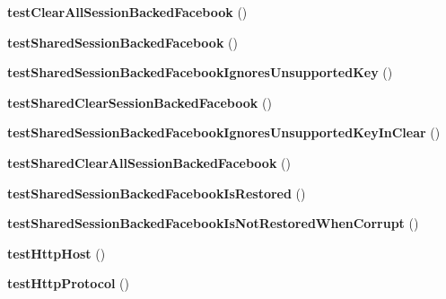 \begin{DoxyCompactItemize}
\item 
\hypertarget{classPHPSDKTestCase_aa4e705ef2f9d8cc54d60a7defe386fb5}{{\bfseries test\-Clear\-All\-Session\-Backed\-Facebook} ()}\label{classPHPSDKTestCase_aa4e705ef2f9d8cc54d60a7defe386fb5}

\item 
\hypertarget{classPHPSDKTestCase_aa0ad510cb5d7db6fb845dbf7a67532d5}{{\bfseries test\-Shared\-Session\-Backed\-Facebook} ()}\label{classPHPSDKTestCase_aa0ad510cb5d7db6fb845dbf7a67532d5}

\item 
\hypertarget{classPHPSDKTestCase_a2acdef47be22ffc68259da2e4dfaf6c0}{{\bfseries test\-Shared\-Session\-Backed\-Facebook\-Ignores\-Unsupported\-Key} ()}\label{classPHPSDKTestCase_a2acdef47be22ffc68259da2e4dfaf6c0}

\item 
\hypertarget{classPHPSDKTestCase_a886b5ab058a6ef6e1200f115213fbf64}{{\bfseries test\-Shared\-Clear\-Session\-Backed\-Facebook} ()}\label{classPHPSDKTestCase_a886b5ab058a6ef6e1200f115213fbf64}

\item 
\hypertarget{classPHPSDKTestCase_a6c82faa9b735cddde60a5899830cb4a8}{{\bfseries test\-Shared\-Session\-Backed\-Facebook\-Ignores\-Unsupported\-Key\-In\-Clear} ()}\label{classPHPSDKTestCase_a6c82faa9b735cddde60a5899830cb4a8}

\item 
\hypertarget{classPHPSDKTestCase_af31d8da1c62feff0fb4d36278fc24a18}{{\bfseries test\-Shared\-Clear\-All\-Session\-Backed\-Facebook} ()}\label{classPHPSDKTestCase_af31d8da1c62feff0fb4d36278fc24a18}

\item 
\hypertarget{classPHPSDKTestCase_ab05f75be0415d027dac62b8c9dde831a}{{\bfseries test\-Shared\-Session\-Backed\-Facebook\-Is\-Restored} ()}\label{classPHPSDKTestCase_ab05f75be0415d027dac62b8c9dde831a}

\item 
\hypertarget{classPHPSDKTestCase_abd4f66d6d3227bbba01caddf92087b00}{{\bfseries test\-Shared\-Session\-Backed\-Facebook\-Is\-Not\-Restored\-When\-Corrupt} ()}\label{classPHPSDKTestCase_abd4f66d6d3227bbba01caddf92087b00}

\item 
\hypertarget{classPHPSDKTestCase_a89dadf8f28fb86a99da4d2788f54038c}{{\bfseries test\-Http\-Host} ()}\label{classPHPSDKTestCase_a89dadf8f28fb86a99da4d2788f54038c}

\item 
\hypertarget{classPHPSDKTestCase_af46e4a32798c96379fe3be70dd963288}{{\bfseries test\-Http\-Protocol} ()}\label{classPHPSDKTestCase_af46e4a32798c96379fe3be70dd963288}


\end{DoxyCompactItemize}
